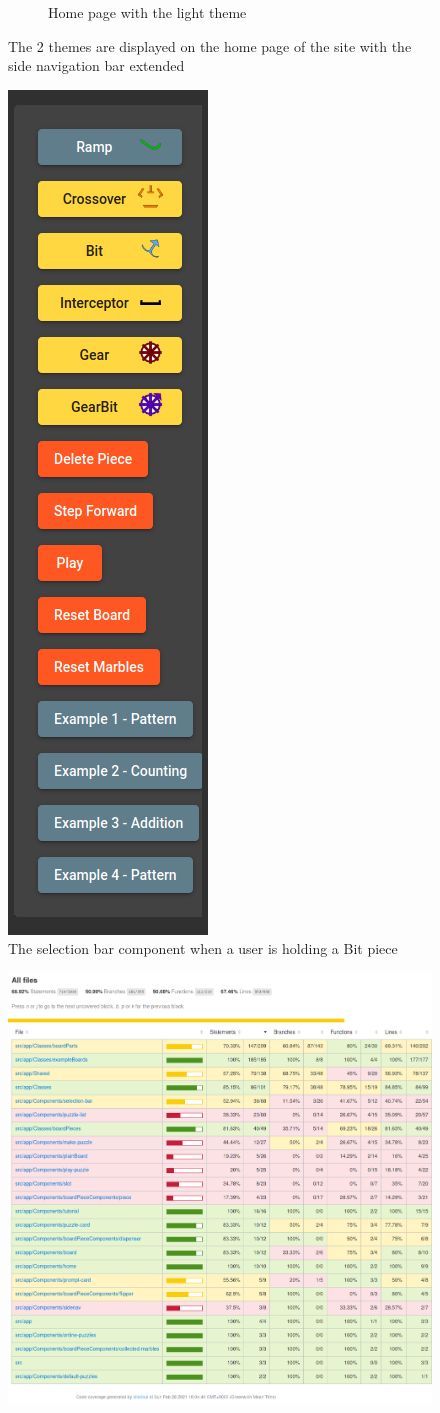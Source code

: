 \documentclass{l4proj}
\begin{document}
\begin{appendices}
\begin{figure}[h]
\begin{subfigure}[b]{0.6\textwidth}
        \caption{Home page with the light theme}
        \label{fig:homepageLight}
    \end{subfigure}
    \caption{The 2 themes are displayed on the home page of the site with the side navigation bar extended}
    \label{fig:themes}
\end{figure}
\newpage

\begin{figure}[h]
    \centering
    \includegraphics[width=0.2\linewidth]{images/selectionBar.png}
    \caption{The selection bar component when a user is holding a Bit piece}
    \label{fig:selectionBar}
\end{figure}
\newpage


\begin{figure}[h]
    \centering
    \includegraphics[width=0.9\linewidth]{images/codeCoverage.png}
    

\end{figure}
\end{appendices}
\end{document}
